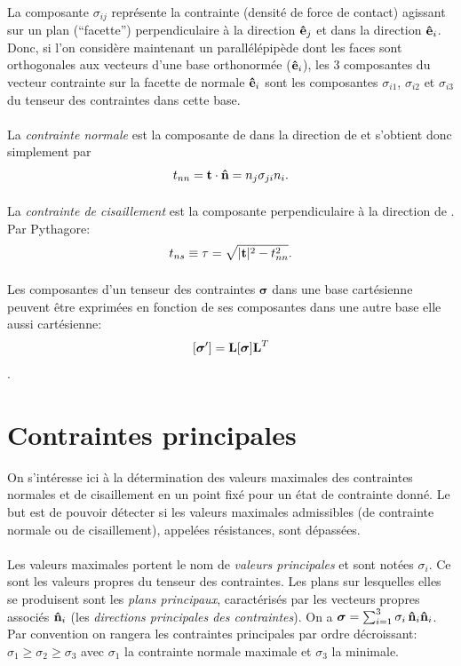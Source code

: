 \paragraph{}
La composante $\sigma_{ij}$ représente la contrainte (densité de force de contact) agissant sur un plan (``facette'') perpendiculaire à la direction $\textbf{ê}_j$ et dans la direction $\textbf{ê}_i$. Donc, si l'on considère maintenant un parallélépipède dont les faces sont orthogonales aux vecteurs d'une base orthonormée ($\textbf{ê}_i$), les 3 composantes du vecteur contrainte sur la facette de normale $\textbf{ê}_i$ sont les composantes $\sigma_{i1}$, $\sigma_{i2}$ et $\sigma_{i3}$ du tenseur des contraintes dans cette base.
\paragraph{}
La \emph{contrainte normale} est la composante de  dans la direction de  et s'obtient donc simplement par
\begin{equation}
\label{eq:tnn}
t_{nn}=\textbf{t}\cdot\textbf{\^n}=n_j\sigma_{ji}n_i.
\end{equation}
\paragraph{}
La \emph{contrainte de cisaillement} est la composante perpendiculaire à la direction de . Par Pythagore:
\begin{equation}
\label{eq:tau}
t_{ns}\equiv\tau=\sqrt{|\textbf{t}|^2-t_{nn}^2}.
\end{equation}
\paragraph{}
Les composantes d'un tenseur des contraintes $\boldsymbol{\sigma}$ dans une base cartésienne peuvent être exprimées en fonction de ses composantes dans une autre base elle aussi cartésienne: $$[\boldsymbol{\sigma}']=\textbf{L}[\boldsymbol{\sigma}]\textbf{L}^T$$.
\section{Contraintes principales}
On s'intéresse ici à la détermination des valeurs maximales des contraintes normales et de cisaillement en un point fixé pour un état de contrainte donné. Le but est de pouvoir détecter si les valeurs maximales admissibles (de contrainte normale ou de cisaillement), appelées résistances, sont dépassées.
\paragraph{}
Les valeurs maximales portent le nom de \emph{valeurs principales} et sont notées $\sigma_i$. Ce sont les valeurs propres du tenseur des contraintes. Les plans sur lesquelles elles se produisent sont les \emph{plans principaux}, caractérisés par les vecteurs propres associés $\textbf{\^n}_i$ (les \emph{directions principales des contraintes}). On a $\boldsymbol{\sigma}=\sum_{i=1}^3 \sigma_i\,\textbf{\^n}_i\textbf{\^n}_i$. Par convention on rangera les contraintes principales par ordre décroissant: $\sigma_1\geq \sigma_2\geq\sigma_3$ avec $\sigma_1$ la contrainte normale maximale et $\sigma_3$ la minimale.
